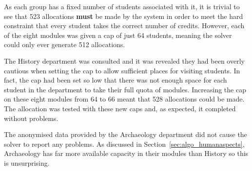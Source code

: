 As each group has a fixed number of students associated with it, it is trivial
to see that 523 allocations \textbf{must} be made by the system in order to
meet the hard constraint that every student takes the correct number of
credits. However, each of the eight modules was given a cap of just 64
students, meaning the solver could only ever generate 512 allocations.

The History department was consulted and it was revealed they had been overly
cautious when setting the cap to allow sufficient places for visiting
students. In fact, the cap had been set so low that there was not enough space
for each student in the department to take their full quota of modules.
Increasing the cap on these eight modules from 64 to 66 meant that 528
allocations could be made. The allocation was tested with these new caps and,
as expected, it completed without problems.

The anonymised data provided by the Archaeology department did not cause the
solver to report any problems. As discussed in
Section~\ref{sec:algo_humanaspects}, Archaeology has far more available
capacity in their modules than History so this is unsurprising.
